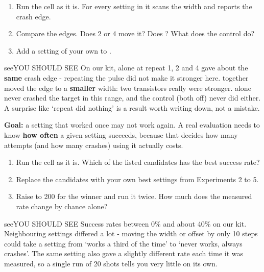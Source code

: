 \documentclass[11pt,letterpaper]{article}
\begin{document}
\vspace{4pt}

\begin{enumerate}[label=\arabic*.,leftmargin=1.8em,itemsep=2pt,topsep=2pt,parsep=0pt,start=1]
\item Run the cell as it is. For every setting in  it scans the width and reports the crash edge.
\item Compare the edges. Does  2 or 4 move it? Does ? What does the control do?
\item Add a setting of your own to .
\end{enumerate}

\begin{guidecallout}{see}{YOU SHOULD SEE}
On our kit,  alone at repeat 1, 2 and 4 gave about the \textbf{same} crash edge - repeating the pulse did not
make it stronger here.  together moved the edge to a \textbf{smaller} width: two transistors really were
stronger.  alone never crashed the target in this range, and the control (both off) never did either. A
surprise like `repeat did nothing' is a result worth writing down, not a mistake.
\end{guidecallout}


\textbf{Goal:} a setting that worked once may not work again. A real evaluation needs to know \textbf{how often} a
given setting succeeds, because that decides how many attempts (and how many crashes) using it actually costs.

\begin{enumerate}[label=\arabic*.,leftmargin=1.8em,itemsep=2pt,topsep=2pt,parsep=0pt,start=1]
\item Run the cell as it is. Which of the listed candidates has the best success rate?
\item Replace the candidates with your own best settings from Experiments 2 to 5.
\item Raise  to 200 for the winner and run it twice. How much does the measured rate change by chance alone?
\end{enumerate}

\begin{guidecallout}{see}{YOU SHOULD SEE}
Success rates between 0\% and about 40\% on our kit. Neighbouring settings differed a lot - moving the width or offset
by only 10 steps could take a setting from `works a third of the time' to `never works, always crashes'. The same
setting also gave a slightly different rate each time it was measured, so a single run of 20 shots tells you very
little on its own.
\end{guidecallout}
\end{document}
